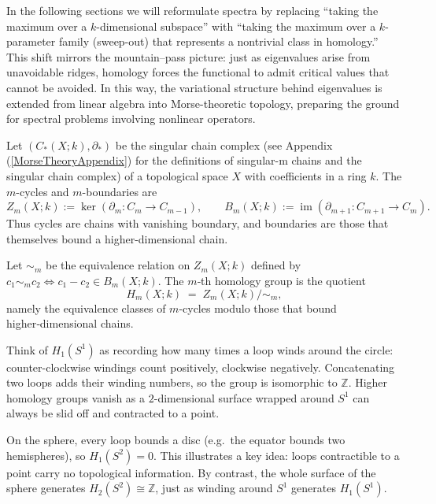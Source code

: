 In the following sections we will reformulate spectra by replacing “taking the maximum over a $k$-dimensional subspace” with “taking the maximum over a $k$-parameter family (sweep-out) that represents a nontrivial class in homology.”
This shift mirrors the mountain–pass picture: just as eigenvalues arise from unavoidable ridges, homology forces the functional to admit critical values that cannot be avoided. In this way, the variational structure behind eigenvalues is extended from linear algebra into Morse-theoretic topology, preparing the ground for spectral problems involving nonlinear operators.

\begin{definition}\label{cycles_n_boundaries}
Let $(C_{*}(X;k),\partial_{*})$ be the singular chain complex (see Appendix (\ref{MorseTheoryAppendix}) for the definitions of singular-m chains and the singular chain complex) of a topological space $X$ with coefficients in a ring $k$.  
The $m$-cycles and $m$-boundaries are
\[
   Z_m(X;k) := \ker(\partial_m:C_m\to C_{m-1}),
   \qquad
   B_m(X;k) := \operatorname{im}(\partial_{m+1}:C_{m+1}\to C_m).
\]
Thus cycles are chains with vanishing boundary, and boundaries are those that themselves bound a higher-dimensional chain.
\end{definition}

\begin{definition}
Let $\sim_m$ be the equivalence relation on $Z_m(X;k)$ defined by $c_1 \sim_m c_2 \Leftrightarrow c_1-c_2 \in B_m(X;k)$.
The $m$‑th homology group is the quotient
\[H_{m}(X;k)\;=\;Z_{m}(X;k)\big/\sim_m,\]
namely the equivalence classes of $m$-cycles modulo those that bound higher‑dimensional chains.
\end{definition}


\begin{example}\label{H(S1)}
Think of $H_1(S^1)$ as recording how many times a loop winds around the circle: counter-clockwise windings count positively, clockwise negatively. Concatenating two loops adds their winding numbers, so the group is isomorphic to $\mathbb Z$. Higher homology groups vanish as a $2$-dimensional surface wrapped around $S^1$ can always be slid off and contracted to a point.  
\end{example}

\begin{example}
On the sphere, every loop bounds a disc (e.g.\ the equator bounds two hemispheres), so $H_1(S^2)=0$. This illustrates a key idea: loops contractible to a point carry no topological information. By contrast, the whole surface of the sphere generates $H_2(S^2)\cong\mathbb Z$, just as winding around $S^1$ generates $H_1(S^1)$.  
\end{example}



